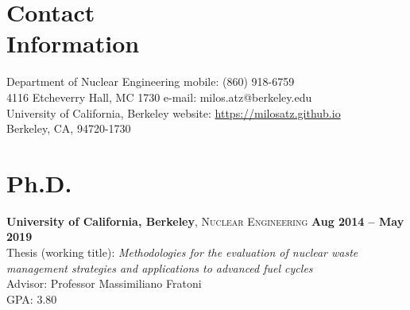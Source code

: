 \documentclass[margin,line]{resume}
\begin{document}
\begin{resume}

\section{\mysidestyle Contact\\Information}
    Department of Nuclear Engineering 
        \hfill mobile: (860) 918-6759 \\
    4116 Etcheverry Hall, MC 1730 
        \hfill e-mail: milos.atz@berkeley.edu \\
    University of California, Berkeley 
        \hfill website: \url{https://milosatz.github.io}\\
    Berkeley, CA, 94720-1730 \\
        
    

%
%
%
%

\section{\mysidestyle Ph.D.}
    \textbf{University of California, Berkeley}, 
    \textsc{Nuclear Engineering} \hfill 
    \textbf{Aug 2014 -- May 2019} \vspace{1mm} \\
    Thesis (working title): \textsl{Methodologies for the evaluation of nuclear waste management strategies and applications to advanced fuel cycles} \\
    Advisor: Professor Massimiliano Fratoni \\
    GPA: 3.80 \\
    

\end{resume}
\end{document}
